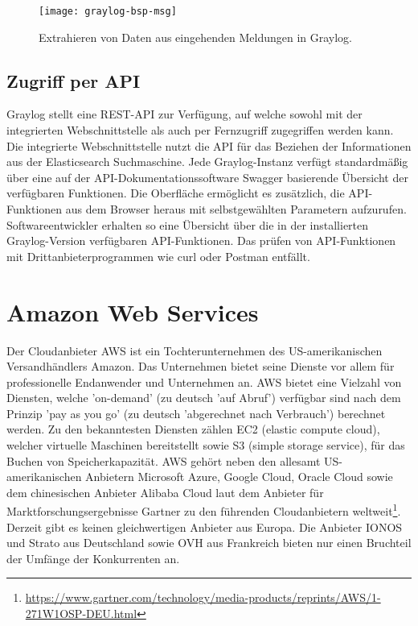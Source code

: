 \begin{figure}[h!]
\centering
\texttt{[image: graylog-bsp-msg]}
\caption{Extrahieren von Daten aus eingehenden Meldungen in Graylog.}
\end{figure}

\subsection{Zugriff per API}

Graylog stellt eine REST-API zur Verfügung, auf welche sowohl mit der integrierten Webschnittstelle als auch per Fernzugriff zugegriffen werden kann. Die integrierte Webschnittstelle nutzt die API für das Beziehen der Informationen aus der Elasticsearch Suchmaschine. Jede Graylog-Instanz verfügt standardmäßig über eine auf der API-Dokumentationssoftware Swagger basierende Übersicht der verfügbaren Funktionen. Die Oberfläche ermöglicht es zusätzlich, die API-Funktionen aus dem Browser heraus mit selbstgewählten Parametern aufzurufen. Softwareentwickler erhalten so eine Übersicht über die in der installierten Graylog-Version verfügbaren API-Funktionen. Das prüfen von API-Funktionen mit Drittanbieterprogrammen wie curl oder Postman entfällt.

\section{Amazon Web Services}

Der Cloudanbieter AWS ist ein Tochterunternehmen des US-amerikanischen Versandhändlers Amazon. Das Unternehmen bietet seine Dienste vor allem für professionelle Endanwender und Unternehmen an. AWS bietet eine Vielzahl von Diensten, welche 'on-demand' (zu deutsch 'auf Abruf') verfügbar sind nach dem Prinzip 'pay as you go' (zu deutsch 'abgerechnet nach Verbrauch') berechnet werden. Zu den bekanntesten Diensten zählen EC2 (elastic compute cloud), welcher virtuelle Maschinen bereitstellt sowie S3 (simple storage service), für das Buchen von Speicherkapazität. AWS gehört neben den allesamt US-amerikanischen Anbietern Microsoft Azure, Google Cloud, Oracle Cloud sowie dem chinesischen Anbieter Alibaba Cloud laut dem Anbieter für Marktforschungsergebnisse Gartner zu den führenden Cloudanbietern weltweit\footnote{\url{https://www.gartner.com/technology/media-products/reprints/AWS/1-271W1OSP-DEU.html}}. Derzeit gibt es keinen gleichwertigen Anbieter aus Europa. Die Anbieter IONOS und Strato aus Deutschland sowie OVH aus Frankreich bieten nur einen Bruchteil der Umfänge der Konkurrenten an.

